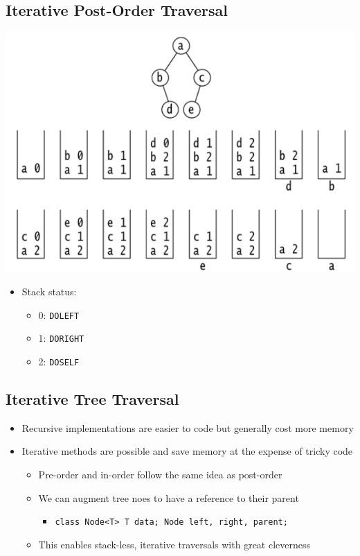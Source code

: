 \documentclass[10pt]{article}
\begin{document}
\subsection*{Iterative Post-Order Traversal}
\begin{center}
    \includegraphics[width=0.5\linewidth]{images/5.png}
\end{center}
\begin{itemize}
    \item Stack status:
    \begin{itemize}
        \item 0: \texttt{DOLEFT}
        \item 1: \texttt{DORIGHT}
        \item 2: \texttt{DOSELF}
    \end{itemize}
\end{itemize}

\subsection*{Iterative Tree Traversal}
\begin{itemize}
    \item Recursive implementations are easier to code but generally cost more memory
    \item Iterative methods are possible and save memory at the expense of tricky code
    \begin{itemize}
        \item Pre-order and in-order follow the same idea as post-order
        \item We can augment tree noes to have a reference to their parent
        \begin{itemize}
            \item \texttt{class Node<T> {T data; Node left, right, parent;}}
        \end{itemize}
        \item This enables stack-less, iterative traversals with great cleverness
    \end{itemize}
\end{itemize}
\end{document}
